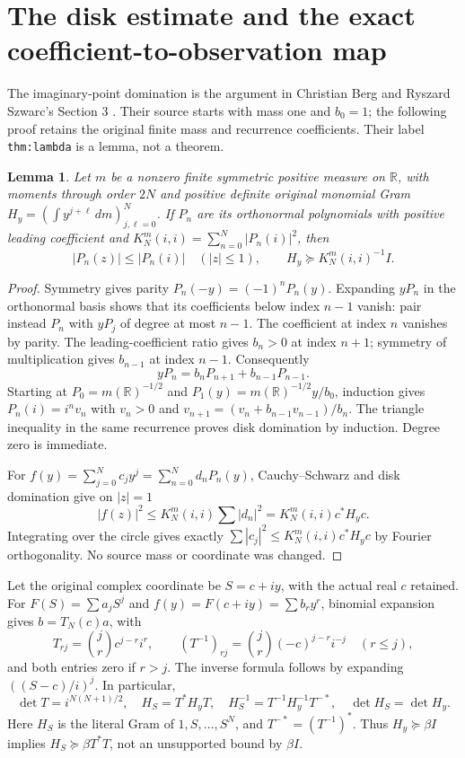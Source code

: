\documentclass[11pt]{article}
\newtheorem{lemma}[theorem]{Lemma}
\newcommand{\R}{\mathbb R}
\begin{document}
\section{The disk estimate and the exact coefficient-to-observation map}

The imaginary-point domination is the argument in Christian Berg and
Ryszard Szwarc's Section 3 \cite{BS}.  Their source starts with mass one
and $b_0=1$; the following proof retains the original finite mass and
recurrence coefficients.  Their label \texttt{thm:lambda} is a lemma,
not a theorem.

\begin{lemma}\label{lem:disk}
Let $m$ be a nonzero finite symmetric positive measure on $\R$, with
moments through order $2N$ and positive definite original monomial Gram
$H_y=(\int y^{j+\ell}\,dm)_{j,\ell=0}^N$.  If $P_n$ are its
orthonormal polynomials with positive leading coefficient and
$K_N^m(i,i)=\sum_{n=0}^N|P_n(i)|^2$, then
\begin{equation}\label{eq:diskgram}
 |P_n(z)|\le|P_n(i)|\quad(|z|\le1),\qquad
 H_y\succeq K_N^m(i,i)^{-1}I.
\end{equation}
\end{lemma}
\begin{proof}
Symmetry gives parity $P_n(-y)=(-1)^nP_n(y)$.  Expanding $yP_n$ in
the orthonormal basis shows that its coefficients below index $n-1$
vanish: pair instead $P_n$ with $yP_j$ of degree at most $n-1$.
The coefficient at index $n$ vanishes by parity.  The leading-coefficient
ratio gives $b_n>0$ at index $n+1$; symmetry of multiplication gives
$b_{n-1}$ at index $n-1$.  Consequently
\[
 yP_n=b_nP_{n+1}+b_{n-1}P_{n-1}.
\]
Starting at $P_0=m(\R)^{-1/2}$ and
$P_1(y)=m(\R)^{-1/2}y/b_0$, induction gives
$P_n(i)=i^nv_n$ with $v_n>0$ and
$v_{n+1}=(v_n+b_{n-1}v_{n-1})/b_n$.
The triangle inequality in the same recurrence proves disk domination
by induction.  Degree zero is immediate.

For $f(y)=\sum_{j=0}^Nc_jy^j=\sum_{n=0}^Nd_nP_n(y)$,
Cauchy--Schwarz and disk domination give on $|z|=1$
\[
 |f(z)|^2\le K_N^m(i,i)\sum|d_n|^2
 =K_N^m(i,i)c^*H_yc.
\]
Integrating over the circle gives exactly
$\sum|c_j|^2\le K_N^m(i,i)c^*H_yc$ by Fourier orthogonality.
No source mass or coordinate was changed.
\end{proof}

Let the original complex coordinate be $S=c+iy$, with the actual real
$c$ retained.  For $F(S)=\sum a_jS^j$ and $f(y)=F(c+iy)=\sum b_ry^r$,
binomial expansion gives $b=T_N(c)a$, with
\begin{equation}\label{eq:T}
 T_{rj}=\binom jr c^{j-r}i^r,\qquad
 (T^{-1})_{rj}=\binom jr(-c)^{j-r}i^{-j}\quad(r\le j),
\end{equation}
and both entries zero if $r>j$.  The inverse formula follows by
expanding $((S-c)/i)^j$.  In particular,
\begin{equation}\label{eq:Tgram}
 \det T=i^{N(N+1)/2},\quad H_S=T^*H_yT,\quad
 H_S^{-1}=T^{-1}H_y^{-1}T^{-*},\quad \det H_S=\det H_y.
\end{equation}
Here $H_S$ is the literal Gram of $1,S,\ldots,S^N$, and
$T^{-*}=(T^{-1})^*$.  Thus $H_y\succeq\beta I$ implies
$H_S\succeq\beta T^*T$, not an unsupported bound by $\beta I$.
\end{document}
